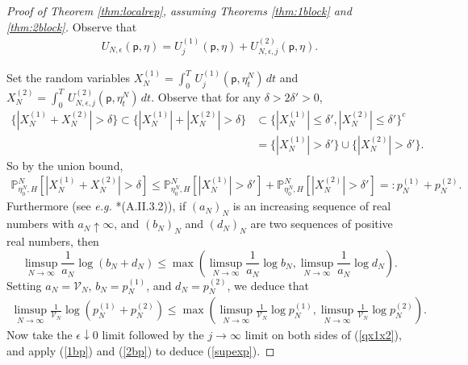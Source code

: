 \documentclass[11pt]{amsart}
\theoremstyle{plain}
\theoremstyle{definition}
\theoremstyle{remark}
\begin{document}
\begin{proof}[Proof of Theorem \ref{thm:localrep}, assuming Theorems \ref{thm:1block} and \ref{thm:2block}]
Observe that
\begin{align}
\label{UDecomp} U_{N,\epsilon}({\mathsf{p}},\eta)= {U^{(1)}_{{{j}}}}({\mathsf{p}},\eta) + {U^{(2)}_{{{N}},{{\epsilon}},{{j}}}}({\mathsf{p}},\eta).
\end{align}

Set the random variables $X^{(1)}_N = \int_0^T \, {U^{(1)}_{{{j}}}}({\mathsf{p}},\eta^N_t)\,dt$ and $X^{(2)}_N = \int_0^T \, {U^{(2)}_{{{N}},{{\epsilon}},{{j}}}}({\mathsf{p}},\eta^N_t)\,dt$. Observe that for any $\delta>2\delta'>0$,
\begin{align*}
\{|X^{(1)}_N + X^{(2)}_N|>\delta\}  \subset \{|X^{(1)}_N|+|X^{(2)}_N| > \delta\} &\subset \{|X^{(1)}_N| \leq \delta', |X^{(2)}_N| \leq \delta'\}^c \\
& = \{|X^{(1)}_N|>\delta'\} \cup \{|X^{(2)}_N|>\delta'\}.
\end{align*}
So by the union bound,
\begin{align*}
\mathbb{P}^N_{\eta_0^N,H}\left[|X^{(1)}_N+X^{(2)}_N|>\delta\right] \leq \mathbb{P}^N_{\eta_0^N,H}\left[|X^{(1)}_N|>\delta'\right] + \mathbb{P}^N_{\eta_0^N,H}\left[|X^{(2)}_N|>\delta'\right] =: p^{(1)}_N + p^{(2)}_N.
\end{align*}
Furthermore (see \emph{e.g.\@} \cite{KipnisLandim}*{(A.II.3.2)}), if $(a_N)_N$ is an increasing sequence of real numbers with $a_N \uparrow \infty$, and $(b_N)_N$ and $(d_N)_N$ are two sequences of positive real numbers, then
\begin{equation}
\label{px1x2}
\limsup_{N\to\infty} \frac{1}{a_N} \log(b_N + d_N) \leq \max \left(\limsup_{N\to\infty} \frac{1}{a_N}\log b_N, \limsup_{N\to\infty} \frac{1}{a_N} \log d_N\right).
\end{equation}
Setting $a_N=\mathcal{V}_N$, $b_N=p^{(1)}_N$, and $d_N=p^{(2)}_N$, we deduce that
\begin{align}
\label{qx1x2}
\limsup_{N\to\infty} \frac{1}{\mathcal{V}_N}\log\left(p^{(1)}_N + p^{(2)}_N\right) \leq \max\left(\limsup_{N\to\infty}\frac{1}{\mathcal{V}_N} \log p^{(1)}_N , \limsup_{N\to\infty} \frac{1}{\mathcal{V}_N}\log p^{(2)}_N \right).
\end{align}
Now take the $\epsilon\downarrow 0$ limit followed by the $j\to\infty$ limit on both sides of (\ref{qx1x2}), and apply (\ref{1bp}) and (\ref{2bp}) to deduce (\ref{supexp}).
\end{proof}
\end{document}
